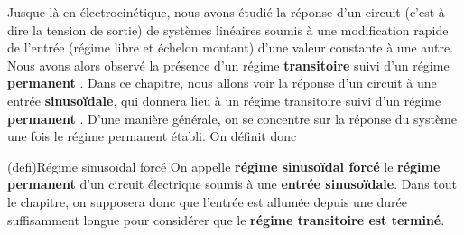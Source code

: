 \documentclass[../../main/main.tex]{subfiles}
\begin{document}
\begin{tcn}[%
		sidebyside, fontupper=\small, fontlower=\small
	]
\begin{tcn}[nsp]
	\end{tcn}
\end{tcn}

\vspace*{\fill}

\newpage

Jusque-là en électrocinétique, nous avons étudié la réponse d'un circuit
(c'est-à-dire la tension de sortie) de systèmes linéaires soumis à une
modification rapide de l'entrée (régime libre et échelon montant) d'une valeur
constante à une autre. Nous avons alors observé la présence d'un régime
\textbf{transitoire} suivi d'un régime \textbf{permanent }.
Dans ce chapitre, nous allons voir la réponse d'un circuit à une entrée
\textbf{sinusoïdale}, qui donnera lieu à un régime transitoire suivi d'un régime
\textbf{permanent }. D'une manière générale, on se
concentre sur la réponse du système une fois le régime permanent établi. On
définit donc

\begin{tcb}[label=def:rsf](defi){Régime sinusoïdal forcé}
	On appelle \textbf{régime sinusoïdal forcé} le \textbf{régime permanent} d'un
	circuit électrique soumis à une \textbf{entrée sinusoïdale}.
	\smallbreak
	Dans tout le chapitre, on supposera donc que l'entrée est allumée depuis une
	durée suffisamment longue pour considérer que le \textbf{régime transitoire
		est terminé}.
	\begin{center}
	\end{center}
\end{tcb}
\end{document}

